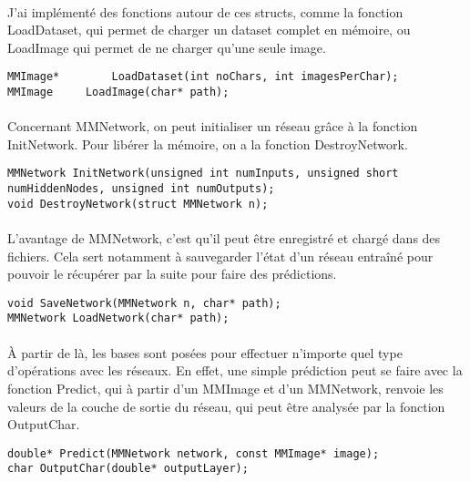 \documentclass{article}
\begin{document}
\paragraph{}J'ai implémenté des fonctions autour de ces structs, comme la fonction LoadDataset, qui permet de charger un dataset complet en mémoire, ou LoadImage qui permet de ne charger qu'une seule image.

\begin{lstlisting}
MMImage*		LoadDataset(int noChars, int imagesPerChar);
MMImage		LoadImage(char* path);
\end{lstlisting}

\paragraph{}Concernant MMNetwork, on peut initialiser un réseau grâce à la fonction InitNetwork.
Pour libérer la mémoire, on a la fonction DestroyNetwork.

\begin{lstlisting}
MMNetwork InitNetwork(unsigned int numInputs, unsigned short numHiddenNodes, unsigned int numOutputs);
void DestroyNetwork(struct MMNetwork n);

\end{lstlisting}

\paragraph{}L'avantage de MMNetwork, c'est qu'il peut être enregistré et chargé dans des fichiers. Cela sert notamment à sauvegarder l'état d'un réseau entraîné pour pouvoir le récupérer par la suite pour faire des prédictions.

\begin{lstlisting}
void SaveNetwork(MMNetwork n, char* path);
MMNetwork LoadNetwork(char* path);
\end{lstlisting}


\paragraph{}
À partir de là, les bases sont posées pour effectuer n'importe quel type d'opérations avec les réseaux. En effet, une simple prédiction peut se faire avec la fonction Predict, qui à partir d'un MMImage et d'un MMNetwork, renvoie les valeurs de la couche de sortie du réseau, qui peut être analysée par la fonction OutputChar.

\begin{lstlisting}
double*	Predict(MMNetwork network, const MMImage* image);
char OutputChar(double* outputLayer);
\end{lstlisting}
\end{document}
